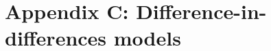 \documentclass[../main.tex]{subfiles}
\begin{document}
\section*{Appendix C: Difference-in-differences models}
\label{sec:appendixc}
\end{document}
